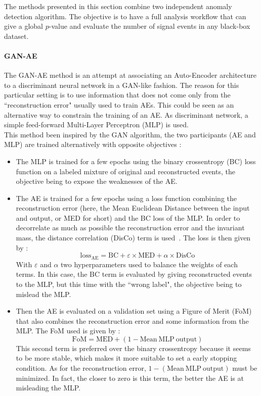 \documentclass[a4paper,11pt]{article}
\begin{document}
\noindent The methods presented in this section combine two independent anomaly detection algorithm.
The objective is to have a full analysis workflow that can give a global $p$-value and evaluate the number of signal events in any black-box dataset.

\paragraph{GAN-AE}


\noindent The GAN-AE method is an attempt at associating an Auto-Encoder architecture to a discriminant neural network in a GAN-like fashion.
The reason for this particular setting is to use information that does not come only from the ``reconstruction error" usually used to train AEs.
This could be seen as an alternative way to constrain the training of an AE.
As discriminant network, a simple feed-forward Multi-Layer Perceptron (MLP) is used. \\

\noindent This method been inspired by the GAN algorithm, the two participants (AE and MLP) are trained alternatively with opposite objectives :

\begin{itemize}
	\item The MLP is trained for a few epochs using the binary crossentropy (BC) loss function on a labeled mixture of original and reconstructed events, the objective being to expose the weaknesses of the AE.
	
	\item The AE is trained for a few epochs using a loss function combining the reconstruction error (here, the Mean Euclidean Distance between the input and output, or MED for short) and the BC loss of the MLP.
	In order to decorrelate as much as possible the reconstruction error and the invariant mass, the distance correlation (DisCo) term is used~\cite{DiscoFever}.
	The loss is then given by :
	$$\text{loss}_\text{AE} = \text{BC}+\varepsilon\times \text{MED}+\alpha\times \text{DisCo}$$
	\noindent With $\varepsilon$ and $\alpha$ two hyperparameters used to balance the weights of each terms. In this case, the BC term is evaluated by giving reconstructed events to the MLP, but this time with the ``wrong label", the objective being to mislead the MLP. 
	
	\item Then the AE is evaluated on a validation set using a Figure of Merit (FoM) that also combines the reconstruction error and some information from the MLP.
	The FoM used is given by :
	$$\text{FoM} = \text{MED}+(1-\text{Mean}~\text{MLP}~\text{output})$$
	\noindent This second term is preferred over the binary crossentropy because it seems to be more stable, which makes it more suitable to set a early stopping condition.
	As for the reconstruction error, $1-(\text{Mean}~\text{MLP}~\text{output})$ must be minimized.
	In fact, the closer to zero is this term, the better the AE is at misleading the MLP.
\end{itemize}
\end{document}
